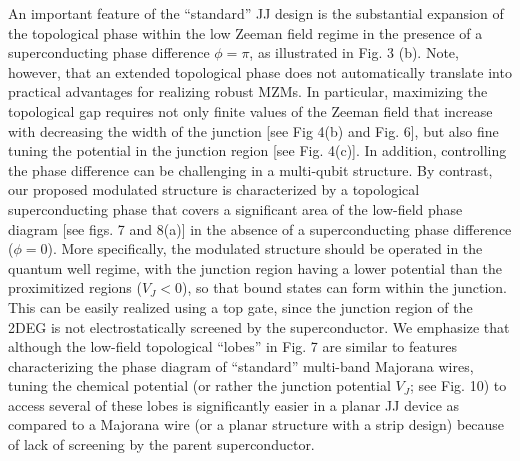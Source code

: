 \documentclass[twocolumn,aps,prb,nofootinbib]{revtex4-2}
\begin{document}
An important feature of the ``standard'' JJ design is the substantial expansion of the topological phase within the low Zeeman field regime in the presence of a superconducting phase difference $\phi=\pi$, as illustrated in Fig. 3 (b). Note, however, that an extended topological phase does not automatically translate into practical advantages for realizing robust MZMs. In particular, maximizing the topological gap requires not only finite values of the Zeeman field  that increase with decreasing the width of the junction [see Fig 4(b) and Fig. 6], but also fine tuning the potential in the junction region [see Fig. 4(c)]. In addition, controlling the phase difference can be challenging in a multi-qubit structure. By contrast, our proposed modulated structure is characterized by a topological superconducting phase that covers a significant area of the low-field phase diagram [see figs. 7 and 8(a)] in the absence of a superconducting phase difference ($\phi =0$). More specifically, the modulated structure should be operated in the quantum well regime, with the junction region having a lower potential than the proximitized regions  ($V_J < 0$), so that bound states can form within the junction. This  can be easily realized using a top gate, since the junction region of the 2DEG is not electrostatically screened by the superconductor. We emphasize that although the low-field topological ``lobes'' in Fig. 7 are similar to features characterizing the phase diagram of ``standard'' multi-band Majorana wires, tuning the chemical potential (or rather the junction potential $V_J$; see Fig. 10) to access several of these lobes is significantly easier in a planar JJ device as compared to a Majorana wire (or a planar structure with a strip design) because of lack of screening by the parent superconductor.
 
\end{document}
